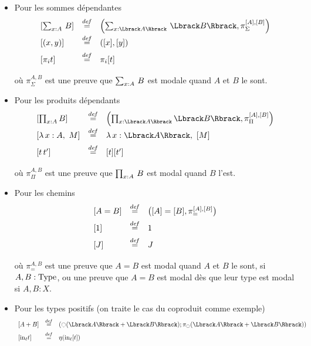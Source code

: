 \begin{otherlanguage}{french}
\begin{itemize}
\item Pour les sommes dépendantes
\[
\begin{array}{lcl}
\left[ \sumD x A B \right] &\defeq&  \left( \sumD x{\Lbrack A \Rbrack}
                                  {\Lbrack B\Rbrack} , \pi_\Sigma^{[A],[B]}
                                \right)\\[0.5em]
  \left[  (x,y)\right] &\defeq& ([x],[y]) \\[0.5em]
  \left[  \pi_i t\right] &\defeq& \pi_i [t] \\[0.5em]
\end{array}
\]
où $\pi_{\Sigma}^{A,B}$ est une preuve que $\sum_{x:A}\, B$ est modale quand
$A$ et $B$ le sont.
\item Pour les produits dépendants
\[
\begin{array}{lcl}
 \left[ \prod_{x:A} B \right] &\defeq& \left( \prod_{x:\Lbrack A \Rbrack}
                                   \Lbrack B\Rbrack , \pi_{\Pi}^{[A],[B]}
                                  \right)\\[0.5em]
\left[  \lambda\, x:A,~M \right] &\defeq&\lambda\,x:\Lbrack A
                                     \Rbrack,~[ M ]
  \\[0.5em]
  \left[ t \, t' \right] &\defeq& [t] [t'] \\[0.5em]
\end{array}
\]
où $\pi_{\Pi}^{A,B}$ est une preuve que $\prod_{x:A}\, B$ est modal quand $B$ l'est.
\item Pour les chemins
\[
\begin{array}{lcl}
\left[  A=B \right] &\overset{de\hspace{-0.2ex}f}{=}& \left( [A] = [ B] , \pi_=^{[A],[B]}
                             \right)\\[0.5em]
\left[ 1 \right] &\overset{de\hspace{-0.2ex}f}{=}& 1\\[0.5em]
\left[ J \right] &\overset{de\hspace{-0.2ex}f}{=}& J \\[0.5em]
\end{array}
\]
où $\pi_{=}^{A,B}$ est une preuve que $A=B$ est modal quand
$A$ et $B$ le sont, si $A,B:\operatorname{Type}$, ou une preuve que $A=B$ est modal
dès que leur type est modal si $A,B:X$.
\item Pour les types positifs (on traite le cas du coproduit comme exemple)
\[
\begin{array}{lcl}
\left[  A+B \right] &\defeq& \left( \modal(\Lbrack A \Rbrack + \Lbrack B
                        \Rbrack); \pi_\modal(\Lbrack A \Rbrack + \Lbrack B
                        \Rbrack)\right)\\[0.5em]
\left[  \mathrm{in}_\ell t \right] &\defeq& \eta (\mathrm{in}_\ell [t]) \\[0.5em]

\end{array}\]
\end{itemize}
\end{otherlanguage}
